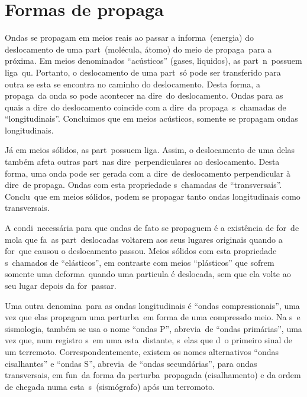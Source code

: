 \section{Formas de propaga\cao}

Ondas se propagam em meios reais ao passar a informa\cao\ (energia) do 
deslocamento de uma part\icula\ (mol\'ecula, \'atomo) do meio de
propaga\cao\ para a pr\'oxima. Em meios denominados ``ac\'usticos''
(gases, liquidos), as part\iculas\ n\ao\ possuem liga\coes\ qu\imicas.
Portanto, o deslocamento de uma part\icula\ s\'o pode ser transferido para
outra se esta se encontra no caminho do deslocamento. Desta forma, a
propaga\cao\ da onda s\´o pode acontecer na dire\cao\ do deslocamento.
Ondas para as quais a dire\cao\ do deslocamento coincide com a dire\cao\
da propaga\cao\ s\ao\ chamadas de ``longitudinais''. Concluimos que em
meios ac\'usticos, somente se propagam ondas longitudinais.

J\'a em meios s\'olidos, as part\iculas\ possuem liga\coes. Assim, o
deslocamento de uma delas tamb\'em afeta outras part\iculas\ nas
dire\coes\ perpendiculares ao deslocamento. Desta forma, uma onda pode ser gerada com a
dire\cao\ de deslocamento perpendicular \`a dire\cao\ de propaga\cao.
Ondas com esta propriedade s\ao\ chamadas de ``transversais''.
Conclu\imos\ que em meios s\'olidos, podem se propagar tanto ondas
longitudinais como transversais.

A condi\cao\ necess\'aria para que ondas de fato se propaguem \'e a
exist\^encia de for\cas\ de mola que fa\cam\ as part\iculas\ deslocadas
voltarem aos seus lugares originais quando a for\ca\ que causou o
deslocamento passou. Meios s\'olidos com esta propriedade s\ao\ chamados
de ``el\'asticos'', em contraste com meios ``pl\'asticos'' que sofrem
somente uma deforma\cao\ quando uma particula \'e deslocada, sem que ela
volte ao seu lugar depois da for\ca\ passar.

Uma outra denomina\cao\ para as ondas longitudinais \'e ``ondas
compressionais'', uma vez que elas propagam uma perturba\cao\ em forma
de uma compress\ao do meio. Na s\ismica\ e sismologia, tamb\'em se usa o
nome ``ondas P'', abrevia\cao\ de ``ondas prim\'arias'', uma vez que,
num registro s\ismico\ em uma esta\cao\ distante, s\ao\ elas que d\ao\ o
primeiro sinal de um terremoto. Correspondentemente, existem os nomes
alternativos ``ondas cisalhantes'' e ``ondas S'', abrevia\cao\ de
``ondas secund\'arias'', para ondas transversais, em fun\cao\ da forma
da perturba\cao\ propagada (cisalhamento) e da ordem de chegada numa
esta\cao\ s\ismica\ (sism\'ografo) ap\'os um terromoto.

